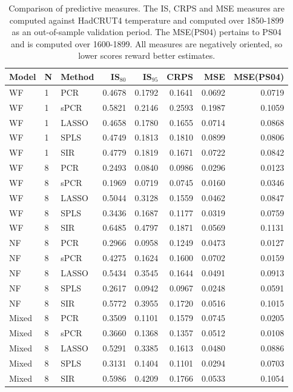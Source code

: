 \documentclass[12pt]{amsart}
\theoremstyle{plain}
\theoremstyle{definition}
\theoremstyle{remark}
\begin{document}
\begin{table}[h!]
  \centering
  {\small
    \begin{tabular}{lll|rrrr|r}
  \toprule
 \textbf{Model} & \textbf{N} & \textbf{Method} & IS$_{80}$ & IS$_{95}$ & CRPS & MSE & MSE(PS04) \\ 
  \midrule
      WF & 1 & PCR & 0.4678 & 0.1792 & 0.1641 & 0.0692 & 0.0719 \\ 
      WF & 1 & sPCR & 0.5821 & 0.2146 & 0.2593 & 0.1987 & 0.1059 \\ 
      WF & 1 & LASSO & 0.4658 & 0.1780 & 0.1655 & 0.0714 & 0.0868 \\
      WF & 1 & SPLS & 0.4749 & 0.1813 & 0.1810 & 0.0899 & 0.0806 \\ 
      WF & 1 & SIR & 0.4779 & 0.1819 & 0.1671 & 0.0722 & 0.0842 \\
      \midrule
      WF & 8 & PCR & 0.2493 & 0.0840 & 0.0986 & 0.0296 & 0.0123 \\ 
      WF & 8 & sPCR & 0.1969 & 0.0719 & 0.0745 & 0.0160 & 0.0346 \\ 
      WF & 8 & LASSO & 0.5044 & 0.3128 & 0.1559 & 0.0462 & 0.0847 \\
      WF & 8 & SPLS & 0.3436 & 0.1687 & 0.1177 & 0.0319 & 0.0759 \\ 
      WF & 8 & SIR & 0.6485 & 0.4797 & 0.1871 & 0.0569 & 0.1131 \\
      \midrule
      NF & 8 & PCR & 0.2966 & 0.0958 & 0.1249 & 0.0473 & 0.0127 \\ 
      NF & 8 & sPCR & 0.4275 & 0.1624 & 0.1600 & 0.0702 & 0.0159 \\
      NF & 8 & LASSO & 0.5434 & 0.3545 & 0.1644 & 0.0491 & 0.0913\\ 
      NF & 8 & SPLS & 0.2617 & 0.0942 & 0.0967 & 0.0248 & 0.0591 \\ 
      NF & 8 & SIR & 0.5772 & 0.3955 & 0.1720 & 0.0516 & 0.1015 \\
      \midrule
      Mixed & 8 & PCR & 0.3509 & 0.1101 & 0.1579 & 0.0745 & 0.0205 \\ 
      Mixed & 8 & sPCR & 0.3660 & 0.1368 & 0.1357 & 0.0512 & 0.0108 \\ 
      Mixed & 8 & LASSO & 0.5291 & 0.3385 & 0.1613 & 0.0480 & 0.0886 \\ 
      Mixed & 8 & SPLS & 0.3131 & 0.1404 & 0.1101 & 0.0294 & 0.0703 \\ 
      Mixed & 8 & SIR & 0.5986 & 0.4209 & 0.1766 & 0.0533 & 0.1054 \\ 
   \bottomrule
\end{tabular}
}
\caption{Comparison of predictive measures. The IS, CRPS and MSE measures are computed against HadCRUT4 temperature and computed over 1850-1899 as an out-of-sample validation period. The MSE(PS04) pertains to PS04 and is computed over 1600-1899. All measures are negatively oriented, so lower scores reward better estimates.}
\label{tab:comparisontot}
\end{table}
\end{document}
